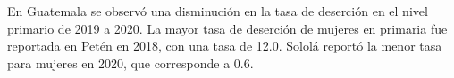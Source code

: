 En Guatemala se observó una disminución en la tasa de deserción en el nivel primario de 2019 a 2020. La mayor tasa de deserción de mujeres en primaria fue reportada en Petén en 2018, con una tasa de 12.0. Sololá reportó la menor tasa para mujeres en 2020, que corresponde a 0.6. 